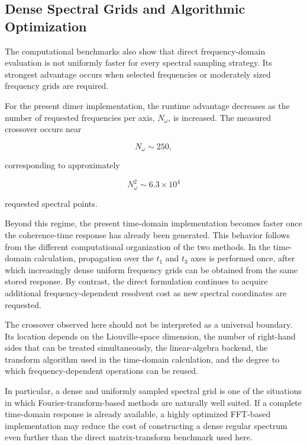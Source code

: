 \documentclass[11pt]{article}
\begin{document}
\subsection{Dense Spectral Grids and Algorithmic Optimization}
\label{subsec:dense_grid_limitation}

The computational benchmarks also show that direct
frequency-domain evaluation is not uniformly faster for every spectral
sampling strategy.  Its strongest advantage occurs when selected
frequencies or moderately sized frequency grids are required.

For the present dimer implementation, the runtime advantage decreases
as the number of requested frequencies per axis, $N_\omega$, is
increased.  The measured crossover occurs near

\begin{equation}
N_\omega
\sim
250,
\end{equation}

corresponding to approximately

\begin{equation}
N_\omega^2
\sim
6.3\times10^4
\end{equation}

requested spectral points.

Beyond this regime, the present time-domain implementation becomes
faster once the coherence-time response has already been generated.
This behavior follows from the different computational organization of
the two methods.  In the time-domain calculation, propagation over the
$t_1$ and $t_3$ axes is performed once, after which increasingly dense
uniform frequency grids can be obtained from the same stored response.
By contrast, the direct formulation continues to acquire additional
frequency-dependent resolvent cost as new spectral coordinates are
requested.

The crossover observed here should not be interpreted as a universal
boundary.  Its location depends on the Liouville-space dimension, the
number of right-hand sides that can be treated simultaneously, the
linear-algebra backend, the transform algorithm used in the
time-domain calculation, and the degree to which frequency-dependent
operations can be reused.

In particular, a dense and uniformly sampled spectral grid is one of
the situations in which Fourier-transform-based methods are naturally
well suited.  If a complete time-domain response is already available,
a highly optimized FFT-based implementation may reduce the cost of
constructing a dense regular spectrum even further than the direct
matrix-transform benchmark used here.
\end{document}
